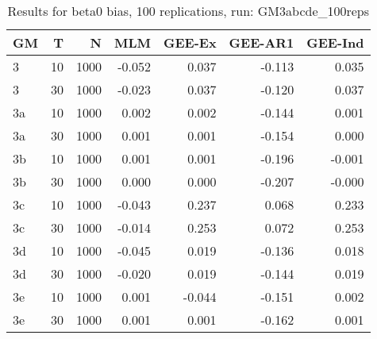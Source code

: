 \begin{table}[ht]
\centering
\begin{tabular}{lrrrrrr}
  \hline
GM & T & N & MLM & GEE-Ex & GEE-AR1 & GEE-Ind \\ 
  \hline
3 & 10 & 1000 & -0.052 & 0.037 & -0.113 & 0.035 \\ 
  3 & 30 & 1000 & -0.023 & 0.037 & -0.120 & 0.037 \\ 
  3a & 10 & 1000 & 0.002 & 0.002 & -0.144 & 0.001 \\ 
  3a & 30 & 1000 & 0.001 & 0.001 & -0.154 & 0.000 \\ 
  3b & 10 & 1000 & 0.001 & 0.001 & -0.196 & -0.001 \\ 
  3b & 30 & 1000 & 0.000 & 0.000 & -0.207 & -0.000 \\ 
   \hline
3c & 10 & 1000 & -0.043 & 0.237 & 0.068 & 0.233 \\ 
  3c & 30 & 1000 & -0.014 & 0.253 & 0.072 & 0.253 \\ 
  3d & 10 & 1000 & -0.045 & 0.019 & -0.136 & 0.018 \\ 
  3d & 30 & 1000 & -0.020 & 0.019 & -0.144 & 0.019 \\ 
  3e & 10 & 1000 & 0.001 & -0.044 & -0.151 & 0.002 \\ 
  3e & 30 & 1000 & 0.001 & 0.001 & -0.162 & 0.001 \\ 
   \hline
\end{tabular}
\caption{Results for beta0 bias, 100 replications, run: GM3abcde_100reps} 
\label{tab:beta0_bias}
\end{table}
